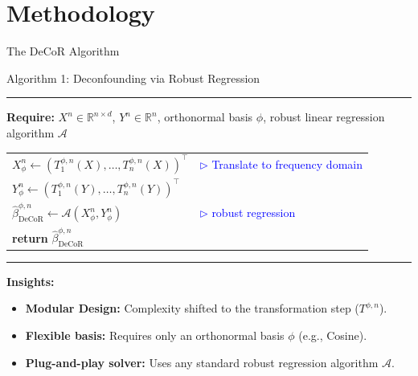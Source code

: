 \section{Methodology}

\begin{frame}{The DeCoR Algorithm}
    \begin{block}{Algorithm 1: Deconfounding via Robust Regression}

        \hrule
        \vspace{0.1cm}
        \textbf{Require:} $X^n \in \mathbb{R}^{n \times d}$, $Y^n \in \mathbb{R}^n$, orthonormal basis $\phi$, robust linear regression algorithm $\mathcal{A}$
        
        \begin{center}
            \begin{tabular}{l l}
                $X_\phi^n \leftarrow (T_1^{\phi,n}(X), \dots, T_n^{\phi,n}(X))^\top$ & \textcolor{blue}{$\triangleright$ Translate to frequency domain}\\
                $Y_\phi^n \leftarrow (T_1^{\phi,n}(Y), \dots, T_n^{\phi,n}(Y))^\top$  \\
                $\hat{\beta}_{\text{DeCoR}}^{\phi,n} \leftarrow \mathcal{A}(X_\phi^n, Y_\phi^n)$ &  \textcolor{blue}{$\triangleright$ robust regression} \\
                \textbf{return} $\hat{\beta}_{\text{DeCoR}}^{\phi,n}$ & 
            \end{tabular}
        \end{center}
        
        \hrule

    \end{block}

    \textbf{Insights:}
        \begin{itemize}
            \item \textbf{Modular Design:} Complexity shifted to the transformation step ($T^{\phi,n}$).
            \item \textbf{Flexible basis:} Requires only an orthonormal basis $\phi$ (e.g., Cosine).
            \item \textbf{Plug-and-play solver:} Uses any standard robust regression algorithm $\mathcal{A}$.
        \end{itemize}
\end{frame}

